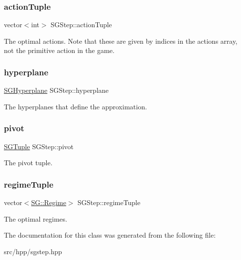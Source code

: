 \subsubsection{\texorpdfstring{action\+Tuple}{actionTuple}}
{\footnotesize\ttfamily vector$<$int$>$ S\+G\+Step\+::action\+Tuple\hspace{0.3cm}{\ttfamily [private]}}

The optimal actions. Note that these are given by indices in the actions array, not the primitive action in the game. \mbox{\label{classSGStep_a72d5305fa558c5ef32118f83a6000e06}} 
\subsubsection{\texorpdfstring{hyperplane}{hyperplane}}
{\footnotesize\ttfamily \hyperlink{classSGHyperplane}{S\+G\+Hyperplane} S\+G\+Step\+::hyperplane\hspace{0.3cm}{\ttfamily [private]}}

The hyperplanes that define the approximation. \mbox{\label{classSGStep_adb0e98277220bdb428de1a6725f6ddd0}} 
\subsubsection{\texorpdfstring{pivot}{pivot}}
{\footnotesize\ttfamily \hyperlink{classSGTuple}{S\+G\+Tuple} S\+G\+Step\+::pivot\hspace{0.3cm}{\ttfamily [private]}}

The pivot tuple. \mbox{\label{classSGStep_ad17acaa7ac465c64b18c3a74fbf07d92}} 
\subsubsection{\texorpdfstring{regime\+Tuple}{regimeTuple}}
{\footnotesize\ttfamily vector$<$\hyperlink{namespaceSG_a139e4dec41ea0f38aae1f93f60cfff60}{S\+G\+::\+Regime}$>$ S\+G\+Step\+::regime\+Tuple\hspace{0.3cm}{\ttfamily [private]}}

The optimal regimes. 

The documentation for this class was generated from the following file\+:\begin{DoxyCompactItemize}
\item 
src/hpp/sgstep.\+hpp\end{DoxyCompactItemize}
